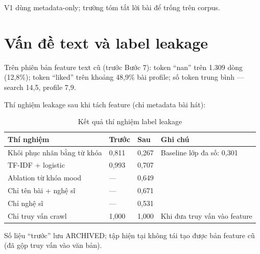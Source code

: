 V1 dùng metadata-only; trường tóm tắt lời bài để trống trên corpus.

\section{Vấn đề text và label leakage}

Trên phiên bản feature text cũ (trước Bước 7): token ``nan'' trên 1.309 dòng (12{,}8\%); token ``liked'' trên khoảng 48{,}9\% bài profile; số token trung bình --- search 14{,}5, profile 7{,}9.

Thí nghiệm leakage sau khi tách feature (chỉ metadata bài hát):

\begin{table}[htbp]
  \centering
  \caption{Kết quả thí nghiệm label leakage}
  \label{tab:leakage}
  \small
  \begin{tabularx}{\textwidth}{@{}L{4.5cm}R{1.5cm}R{1.5cm}X@{}}
    \toprule
    \textbf{Thí nghiệm} & \textbf{Trước} & \textbf{Sau} & \textbf{Ghi chú} \\
    \midrule
    Khôi phục nhãn bằng từ khóa & 0{,}811 & 0{,}267 & Baseline lớp đa số: 0{,}301 \\
    TF-IDF + logistic & 0{,}993 & 0{,}707 & \\
    Ablation từ khóa mood & --- & 0{,}649 & \\
    Chỉ tên bài + nghệ sĩ & --- & 0{,}671 & \\
    Chỉ nghệ sĩ & --- & 0{,}531 & \\
    Chỉ truy vấn crawl & 1{,}000 & 1{,}000 & Khi đưa truy vấn vào feature \\
    \bottomrule
  \end{tabularx}
\end{table}

Số liệu ``trước'' lưu ARCHIVED; tập hiện tại không tái tạo được bản feature cũ (đã gộp truy vấn vào văn bản).
